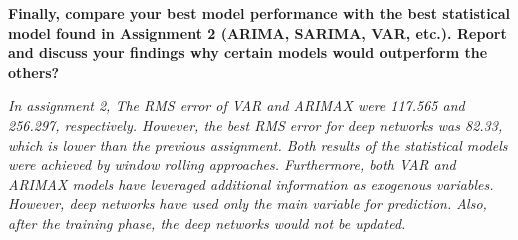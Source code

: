 \item \textbf{Finally, compare your best model performance with the best statistical model found in Assignment 2 (ARIMA, SARIMA, VAR, etc.). Report and discuss your findings why certain models would outperform the others?} 


\textit{In assignment 2, The RMS error of VAR and ARIMAX were 117.565 and 256.297, respectively. However, the best RMS error for deep networks was 82.33, which is lower than the previous assignment.
Both results of the statistical models were achieved by window rolling approaches. Furthermore, both VAR and ARIMAX models have leveraged additional information as exogenous variables. However, deep networks have used only the main variable for prediction. Also, after the training phase, the deep networks would not be updated.} 



